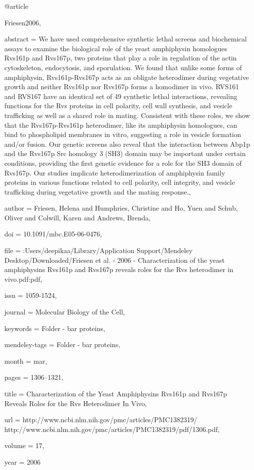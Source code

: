 @article{Friesen2006,

abstract = {We have used comprehensive synthetic lethal screens and biochemical assays to examine the biological role of the yeast amphiphysin homologues Rvs161p and Rvs167p, two proteins that play a role in regulation of the actin cytoskeleton, endocytosis, and sporulation. We found that unlike some forms of amphiphysin, Rvs161p-Rvs167p acts as an obligate heterodimer during vegetative growth and neither Rvs161p nor Rvs167p forms a homodimer in vivo. RVS161 and RVS167 have an identical set of 49 synthetic lethal interactions, revealing functions for the Rvs proteins in cell polarity, cell wall synthesis, and vesicle trafficking as well as a shared role in mating. Consistent with these roles, we show that the Rvs167p-Rvs161p heterodimer, like its amphiphysin homologues, can bind to phospholipid membranes in vitro, suggesting a role in vesicle formation and/or fusion. Our genetic screens also reveal that the interaction between Abp1p and the Rvs167p Src homology 3 (SH3) domain may be important under certain conditions, providing the first genetic evidence for a role for the SH3 domain of Rvs167p. Our studies implicate heterodimerization of amphiphysin family proteins in various functions related to cell polarity, cell integrity, and vesicle trafficking during vegetative growth and the mating response.},

author = {Friesen, Helena and Humphries, Christine and Ho, Yuen and Schub, Oliver and Colwill, Karen and Andrews, Brenda},

doi = {10.1091/mbc.E05-06-0476},

file = {:Users/deepikaa/Library/Application Support/Mendeley Desktop/Downloaded/Friesen et al. - 2006 - Characterization of the yeast amphiphysins Rvs161p and Rvs167p reveals roles for the Rvs heterodimer in vivo.pdf:pdf},

issn = {1059-1524},

journal = {Molecular Biology of the Cell},

keywords = {Folder - bar proteins},

mendeley-tags = {Folder - bar proteins},

month = {mar},

pages = {1306--1321},

title = {{Characterization of the Yeast Amphiphysins Rvs161p and Rvs167p Reveals Roles for the Rvs Heterodimer In Vivo}},

url = {http://www.ncbi.nlm.nih.gov/pmc/articles/PMC1382319/ http://www.ncbi.nlm.nih.gov/pmc/articles/PMC1382319/pdf/1306.pdf},

volume = {17},

year = {2006}

}

